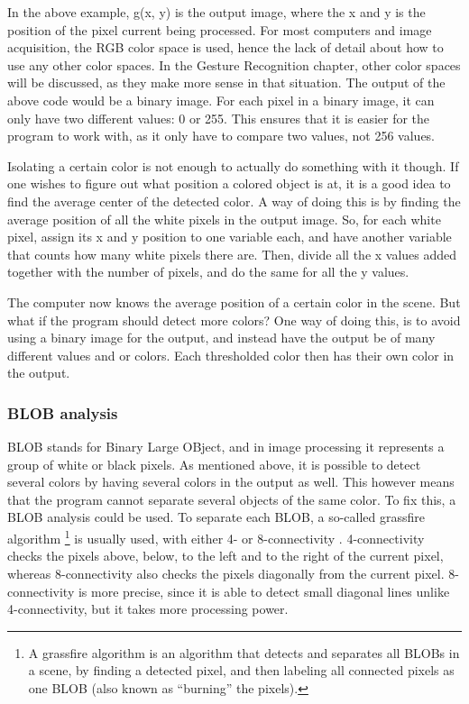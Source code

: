 In the above example, g(x, y) is the output image, where the x and y is the position of the pixel current being processed. For most computers and image acquisition, the RGB color space is used, hence the lack of detail about how to use any other color spaces. In the Gesture Recognition chapter, other color spaces will be discussed, as they make more sense in that situation. The output of the above code would be a binary image. For each pixel in a binary image, it can only have two different values: 0 or 255. This ensures that it is easier for the program to work with, as it only have to compare two values, not 256 values.

Isolating a certain color is not enough to actually do something with it though. If one wishes to figure out what position a colored object is at, it is a good idea to find the average center of the detected color. A way of doing this is by finding the average position of all the white pixels in the output image. So, for each white pixel, assign its x and y position to one variable each, and have another variable that counts how many white pixels there are. Then, divide all the x values added together with the number of pixels, and do the same for all the y values.

The computer now knows the average position of a certain color in the scene. But what if the program should detect more colors? One way of doing this, is to avoid using a binary image for the output, and instead have the output be of many different values and or colors. Each thresholded color then has their own color in the output.

\subsubsection{BLOB analysis} \label{sec:blob}
BLOB stands for Binary Large OBject, and in image processing it represents a group of white or black pixels. As mentioned above, it is possible to detect several colors by having several colors in the output as well. This however means that the program cannot separate several objects of the same color. To fix this, a BLOB analysis could be used. To separate each BLOB, a so-called grassfire algorithm 
\footnote{A grassfire algorithm is an algorithm that detects and separates all BLOBs in a scene, by finding a detected pixel, and then labeling all connected pixels as one BLOB (also known as “burning” the pixels).} 
is usually used, with either 4- or 8-connectivity \parencite{Moeslund2012}. 4-connectivity checks the pixels above, below, to the left and to the right of the current pixel, whereas 8-connectivity also checks the pixels diagonally from the current pixel. 8-connectivity is more precise, since it is able to detect small diagonal lines unlike 4-connectivity, but it takes more processing power.
\bigskip

